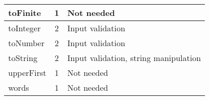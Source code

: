 \documentclass[a4paper, 12pt]{article}
\begin{document}
\begin{table}[h]
\begin{tabular}{l|c|l}
	    toFinite     & 1                 & Not needed                            \\ \hline
	    toInteger    & 2                 & Input validation                      \\ \hline
	    toNumber     & 2                 & Input validation                      \\  \hline
	    toString     & 2                 & Input validation, string manipulation \\ \hline
	    upperFirst   & 1                 & Not needed                            \\ \hline
	    words        & 1                 & Not needed                           
	    \end{tabular}
    \end{table}
\end{document}
